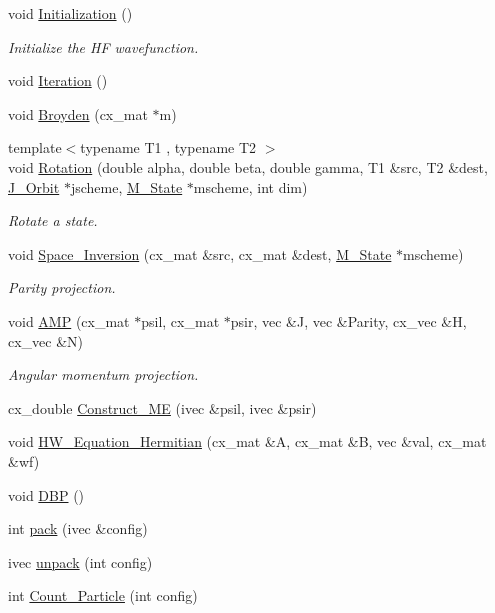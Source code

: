 \begin{DoxyCompactItemize}
void \hyperlink{class_hartree_fock_a727be4c17f68c9ce3cbfcaae6f97e752}{Initialization} ()
\begin{DoxyCompactList}\small\item\em Initialize the H\-F wavefunction. \end{DoxyCompactList}\item 
void \hyperlink{class_hartree_fock_a0ae03c7ead906063143f0047d32f1ee1}{Iteration} ()
\item 
void \hyperlink{class_hartree_fock_a1d8f2d0c9841c8b999fa31758b059214}{Broyden} (cx\-\_\-mat $\ast$m)
\item 
{\footnotesize template$<$typename T1 , typename T2 $>$ }\\void \hyperlink{class_hartree_fock_a6e1d4d4e338a2d55746543a230035121}{Rotation} (double alpha, double beta, double gamma, T1 \&src, T2 \&dest, \hyperlink{class_j___orbit}{J\-\_\-\-Orbit} $\ast$jscheme, \hyperlink{class_m___state}{M\-\_\-\-State} $\ast$mscheme, int dim)
\begin{DoxyCompactList}\small\item\em Rotate a state. \end{DoxyCompactList}\item 
void \hyperlink{class_hartree_fock_af5b3a51f8b65bdda59845648a4865d80}{Space\-\_\-\-Inversion} (cx\-\_\-mat \&src, cx\-\_\-mat \&dest, \hyperlink{class_m___state}{M\-\_\-\-State} $\ast$mscheme)
\begin{DoxyCompactList}\small\item\em Parity projection. \end{DoxyCompactList}\item 
void \hyperlink{class_hartree_fock_a83bfa55f6be64c2b678df42801594e52}{A\-M\-P} (cx\-\_\-mat $\ast$psil, cx\-\_\-mat $\ast$psir, vec \&J, vec \&Parity, cx\-\_\-vec \&H, cx\-\_\-vec \&N)
\begin{DoxyCompactList}\small\item\em Angular momentum projection. \end{DoxyCompactList}\item 
cx\-\_\-double \hyperlink{class_hartree_fock_a19fc02314568b45713933525cf62f11c}{Construct\-\_\-\-M\-E} (ivec \&psil, ivec \&psir)
\item 
void \hyperlink{class_hartree_fock_a14aa8c8c8fff19eb82609abc7fb24958}{H\-W\-\_\-\-Equation\-\_\-\-Hermitian} (cx\-\_\-mat \&A, cx\-\_\-mat \&B, vec \&val, cx\-\_\-mat \&wf)
\item 
void \hyperlink{class_hartree_fock_a36141675bcd557c4241e82b9bf964577}{D\-B\-P} ()
\item 
int \hyperlink{class_hartree_fock_a2cb43d38447325572989595370320706}{pack} (ivec \&config)
\item 
ivec \hyperlink{class_hartree_fock_a65f76efc9fb81e474af5985c52861e0d}{unpack} (int config)
\item 
int \hyperlink{class_hartree_fock_af0c009ecdaf0308740355bc6c2482bc2}{Count\-\_\-\-Particle} (int config)
\end{DoxyCompactItemize}
